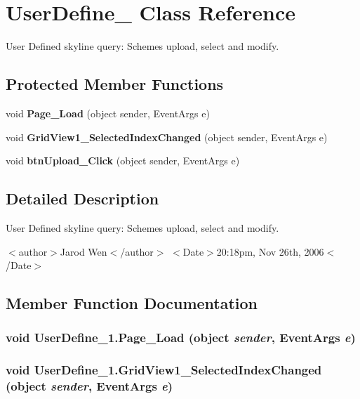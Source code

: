 \section{User\-Define\_ Class Reference}
\label{class_user_define__1}
User Defined skyline query: Schemes upload, select and modify.  


\subsection*{Protected Member Functions}
\begin{CompactItemize}
\item 
void {\bf Page\_\-Load} (object sender, Event\-Args e)
\item 
void {\bf Grid\-View1\_\-Selected\-Index\-Changed} (object sender, Event\-Args e)
\item 
void {\bf btn\-Upload\_\-Click} (object sender, Event\-Args e)
\end{CompactItemize}


\subsection{Detailed Description}
User Defined skyline query: Schemes upload, select and modify. 

$<$author$>$Jarod Wen$<$/author$>$ $<$Date$>$20:18pm, Nov 26th, 2006$<$/Date$>$ 



\subsection{Member Function Documentation}
\subsubsection{\setlength{\rightskip}{0pt plus 5cm}void User\-Define\_\-1.Page\_\-Load (object {\em sender}, Event\-Args {\em e})\hspace{0.3cm}{\tt  [protected]}}\label{class_user_define__1_1d150e4e5e939bf4b4a803a1f7cdb8d4}


\subsubsection{\setlength{\rightskip}{0pt plus 5cm}void User\-Define\_\-1.Grid\-View1\_\-Selected\-Index\-Changed (object {\em sender}, Event\-Args {\em e})\hspace{0.3cm}{\tt  [protected]}}\label{class_user_define__1_5de6fb3f99302207b1d102fbfd814c69}


